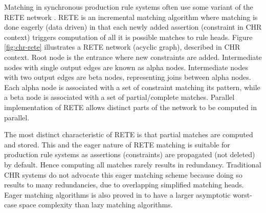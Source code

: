 \documentclass{tlp}
\begin{document}
Matching in synchronous production rule systems often use some variant of the 
RETE network \cite{Forgy82}. RETE is an incremental matching algorithm where matching 
is done eagerly (data driven) in that each newly added assertion (constraint in CHR context) 
triggers computation of all it is possible matches to rule heads. Figure \ref{fig:chr-rete} 
illustrates a RETE network (acyclic graph), described in CHR context. Root node is the 
entrance where new constraints are added. Intermediate nodes with single output edges are 
known as alpha nodes. Intermediate nodes with two output edges are beta nodes, representing 
joins between alpha nodes. Each alpha node is associated with a set of constraint matching 
its pattern, while a beta node is associated with a set of partial/complete matches. Parallel 
implementation of RETE \cite{85035} allows distinct parts of the network to be computed in parallel.

The most distinct characteristic of RETE is that partial matches are computed and stored.
This and the eager nature of RETE matching is suitable for production rule systems
as assertions (constraints) are propagated (not deleted) by default. Hence computing
all matches rarely results in redundancy. Traditional CHR systems do not advocate
this eager matching scheme because doing so results to many redundancies, due to
overlapping simplified matching heads. Eager matching algorithms is also proved in
\cite{leaps90} to have a larger asymptotic worst-case space complexity than lazy 
matching algorithms. 
\end{document}
